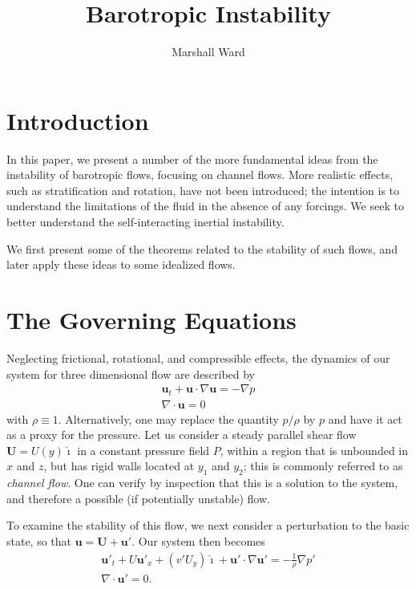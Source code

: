 \documentclass[letterpaper, 11pt, onecolumn]{article}
\title{Barotropic Instability}
\author{Marshall Ward}
\begin{document}
\maketitle

\section{Introduction}

In this paper, we present a number of the more fundamental ideas from the instability of barotropic flows, focusing on channel flows. More realistic effects, such as stratification and rotation, have not been introduced; the intention is to understand the limitations of the fluid in the absence of any forcings. We seek to better understand the self-interacting inertial instability.

We first present some of the theorems related to the stability of such flows, and later apply these ideas to some idealized flows.

\section{The Governing Equations}

Neglecting frictional, rotational, and compressible effects, the dynamics of our system for three dimensional flow are described by
\begin{subequations}\label{BasicEqns}
\begin{gather}
\bm{u}_t + \bm{u} \cdot \nabla \bm{u} = - \nabla p \\
\nabla \cdot \bm{u} = 0
\end{gather}
\end{subequations}
with $\rho \equiv 1$. Alternatively, one may replace the quantity $p / \rho$ by $p$ and have it act as a proxy for the pressure. Let us consider a steady parallel shear flow $\bm{U} = U(y)\hat{\bm{\imath}}$ in a constant pressure field $P$, within a region that is unbounded in $x$ and $z$, but has rigid walls located at $y_1$ and $y_2$; this is commonly referred to as \emph{channel flow}. One can verify by inspection that this is a solution to the system, and therefore a possible (if potentially unstable) flow.

To examine the stability of this flow, we next consider a perturbation to the basic state, so that $\bm{u} = \bm{U} + \bm{u}'$. Our system then becomes
\begin{subequations}\label{3Dsystem}
\begin{gather}
\bm{u}'_t + U \bm{u}'_x + \left(v' U_y \right) \hat{\bm{\imath}} + \bm{u}' \cdot \nabla \bm{u}' = - \frac{1}{\rho} \nabla p' \\
\nabla \cdot \bm{u}' = 0.
\end{gather}
\end{subequations}
\end{document}
